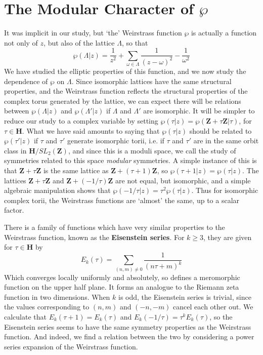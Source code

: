 \section{The Modular Character of $\wp$}

It was implicit in our study, but `the' Weirstrass function $\wp$ is actually a function not only of $z$, but also of the lattice $\Lambda$, so that
%
\[ \wp(\Lambda| z) = \frac{1}{z^2} + \sum_{\omega \in \Lambda} \frac{1}{(z - \omega)^2} - \frac{1}{\omega^2} \]
%
We have studied the elliptic properties of this function, and we now study the dependence of $\wp$ on $\Lambda$. Since isomorphic lattices have the same structural properties, and the Weirstrass function reflects the structural properties of the complex torus generated by the lattice, we can expect there will be relations between $\wp(\Lambda | z)$ and $\wp(\Lambda' | z)$ if $\Lambda$ and $\Lambda'$ are isomorphic. It will be simpler to reduce our study to a complex variable by setting $\wp(\tau|z) = \wp(\mathbf{Z} + \tau \mathbf{Z}| \tau)$, for $\tau \in \mathbf{H}$. What we have said amounts to saying that $\wp(\tau|z)$ should be related to $\wp(\tau'|z)$ if $\tau$ and $\tau'$ generate isomorphic torii, i.e. if $\tau$ and $\tau'$ are in the same orbit class in $\mathbf{H}/SL_2(\mathbf{Z})$, and since this is a moduli space, we call the study of symmetries related to this space {\it modular} symmetries. A simple instance of this is that $\mathbf{Z} + \tau \mathbf{Z}$ is the same lattice as $\mathbf{Z} + (\tau + 1) \mathbf{Z}$, so $\wp(\tau + 1|z) = \wp(\tau|z)$. The lattices $\mathbf{Z} + \tau \mathbf{Z}$ and $\mathbf{Z}  + (- 1/\tau) \mathbf{Z}$ are not equal, but isomorphic, and a simple algebraic manipulation shows that $\wp(-1/\tau|z) = \tau^2 \wp(\tau|z)$. Thus for isomorphic complex torii, the Weirstrass functions are `almost' the same, up to a scalar factor.

There is a family of functions which have very similar properties to the Weirstrass function, known as the {\bf Eisenstein series}. For $k \geq 3$, they are given for $\tau \in \mathbf{H}$ by
%
\[ E_k(\tau) = \sum_{(n,m) \neq 0} \frac{1}{(n \tau + m)^k} \]
%
Which converges locally uniformly and absolutely, so defines a meromorphic function on the upper half plane. It forms an analogue to the Riemann zeta function in two dimensions. When $k$ is odd, the Eisenstein series is trivial, since the values corresponding to $(n,m)$ and $(-n,-m)$ cancel each other out. We calculate that $E_k(\tau + 1) = E_k(\tau)$ and $E_k(-1/\tau) = \tau^k E_k(\tau)$, so the Eisenstein series seems to have the same symmetry properties as the Weirstrass function. And indeed, we find a relation between the two by considering a power series expansion of the Weirstrass function.

